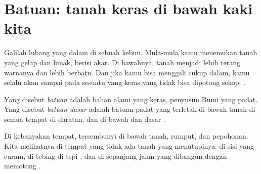 \section{Batuan: tanah keras di bawah kaki kita}

Galilah lubang yang dalam di sebuah kebun. Mula-mula kamu menemukan tanah
yang gelap dan lunak, berisi akar. Di bawahnya, tanah menjadi lebih terang
warnanya dan lebih berbatu. Dan jika kamu bisa menggali cukup dalam, kamu
selalu akan sampai pada sesuatu yang keras yang tidak bisa dipotong sekop:
.

\begin{definition}\label{def:g3:stones-pebbles-sand:rock}
Yang disebut \emph{batuan} adalah bahan alami yang keras,
penyusun Bumi yang padat. Yang disebut \emph{batuan dasar}
adalah batuan padat yang terletak di bawah tanah di semua tempat di daratan,
dan di bawah  dan  dasar .
\end{definition}

Di kebanyakan tempat,  tersembunyi di bawah tanah, rumput, dan
pepohonan. Kita melihatnya di tempat yang tidak ada tanah yang menutupinya:
di sisi  yang curam, di tebing di tepi , dan di sepanjang jalan
yang dibangun dengan memotong .


